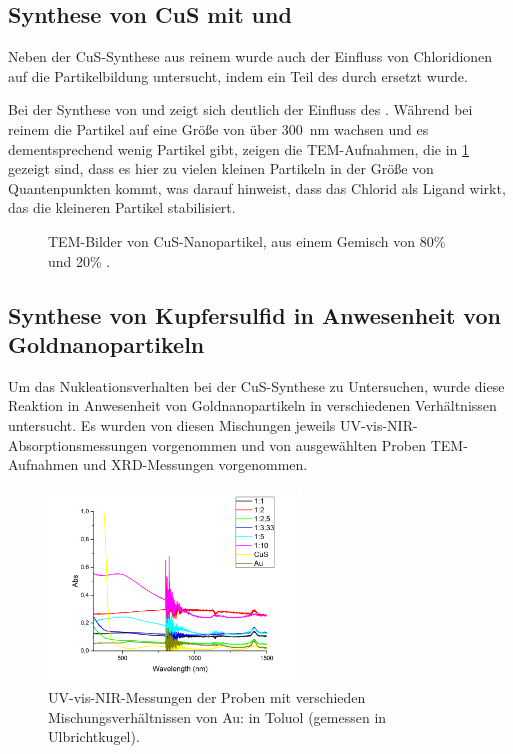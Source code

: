 	

	
	
\subsection{Synthese von CuS mit  und }
	
	Neben der CuS-Synthese aus reinem  wurde auch der Einfluss von Chloridionen auf die Partikelbildung untersucht, indem ein Teil des  durch  ersetzt wurde.
	 
	Bei der Synthese von  und  zeigt sich deutlich der Einfluss des . 
	Während bei reinem  die Partikel auf eine Größe von über \SI{300}{\nano\meter} wachsen und es dementsprechend wenig Partikel gibt, zeigen die TEM-Aufnahmen, die in \cref{fig:TEM-CuCl} gezeigt sind, dass es hier zu vielen kleinen Partikeln in der Größe von Quantenpunkten kommt, was darauf hinweist, dass das Chlorid als Ligand wirkt, das die kleineren Partikel stabilisiert.
	
	\begin{figure}[H]
		\centering
		\caption{TEM-Bilder von CuS-Nanopartikel, aus einem Gemisch von 80\%  und 20\% .}
		\label{fig:TEM-CuCl}
	\end{figure}
	
\subsection{Synthese von Kupfersulfid in Anwesenheit von Goldnanopartikeln}

	Um das Nukleationsverhalten bei der CuS-Synthese zu Untersuchen, wurde diese Reaktion in Anwesenheit von Goldnanopartikeln in verschiedenen Verhältnissen untersucht.
	Es wurden von diesen Mischungen jeweils UV-vis-NIR-Absorptionsmessungen vorgenommen und von ausgewählten Proben TEM-Aufnahmen und XRD-Messungen vorgenommen.
	
	\begin{figure}[H]
		\centering
		\includegraphics[width=0.6\textwidth]{Bilder/UV-AuCu-Konz} 	
		\caption{UV-vis-NIR-Messungen der Proben mit verschieden Mischungsverhältnissen von Au: in Toluol (gemessen in Ulbrichtkugel).}
		\label{fig:UV-AuCu}
	\end{figure}
	
